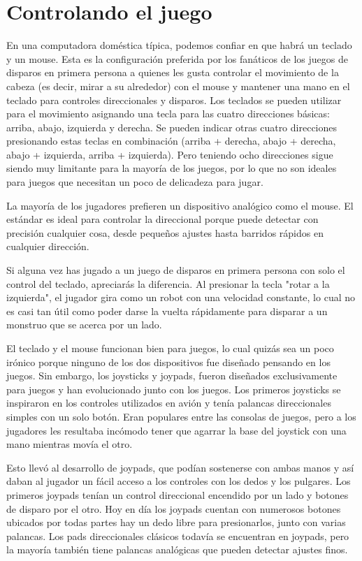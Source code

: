 {\section*{Controlando el juego}

En una computadora doméstica típica, podemos confiar en que habrá un teclado y un mouse. Esta es la configuración preferida
por los fanáticos de los juegos de disparos en primera persona a quienes les gusta controlar el movimiento 
de la cabeza (es decir, mirar a su alrededor) con el mouse y mantener una mano en el teclado para controles 
direccionales y disparos. Los teclados se pueden utilizar para el movimiento asignando una tecla para las 
cuatro direcciones básicas: arriba, abajo, izquierda y derecha. Se pueden indicar otras cuatro direcciones
presionando estas teclas en combinación (arriba + derecha, abajo + derecha, abajo + izquierda, arriba + izquierda).
Pero teniendo ocho direcciones sigue siendo muy limitante para la mayoría de los juegos, por lo que no son ideales 
para juegos que necesitan un poco de delicadeza para jugar.

La mayoría de los jugadores prefieren un dispositivo analógico como el mouse. El  estándar es ideal para controlar la 
direccional porque puede detectar con precisión cualquier cosa, desde pequeños ajustes hasta barridos rápidos en 
cualquier dirección.

Si alguna vez has jugado a un juego de disparos en primera persona con solo el control del teclado, apreciarás la diferencia.
Al presionar la tecla "rotar a la izquierda", el jugador gira como un robot con una velocidad constante, lo cual no es
casi tan útil como poder darse la vuelta rápidamente para disparar a un monstruo que se acerca por un lado.

El teclado y el mouse funcionan bien para juegos, lo cual quizás sea un poco irónico porque ninguno de los dos dispositivos
fue diseñado pensando en los juegos. Sin embargo, los joysticks y joypads, fueron diseñados exclusivamente para juegos y han
evolucionado junto con los juegos. Los primeros joysticks se inspiraron en los controles utilizados en
avión y tenía palancas direccionales simples con un solo botón. Eran populares entre las consolas de juegos, pero a los jugadores les resultaba incómodo tener que agarrar la base del joystick con una mano mientras movía el otro. 

Esto llevó al desarrollo de joypads, que podían sostenerse con ambas manos y así daban al jugador un fácil acceso 
a los controles con los dedos y los pulgares. Los primeros joypads tenían un control direccional encendido
por un lado y botones de disparo por el otro. Hoy en día los joypads cuentan con numerosos botones ubicados por todas partes
hay un dedo libre para presionarlos, junto con varias palancas. Los pads direccionales clásicos todavía se encuentran en
joypads, pero la mayoría también tiene palancas analógicas que pueden detectar ajustes finos. 

}
